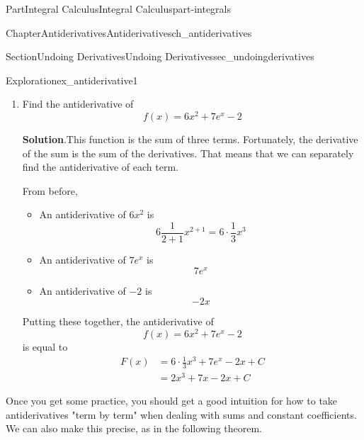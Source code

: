 \documentclass{tufte-book}
\newcommand{\blocktitlefont}{\relax}
\numberwithin{equation}{chapter}
\newcommand{\amp}{&}
\begin{document}
\begin{partptx}{Part}{Integral Calculus}{}{Integral Calculus}{}{}{part-integrals}
\begin{chapterptx}{Chapter}{Antiderivatives}{}{Antiderivatives}{}{}{ch_antiderivatives}
\begin{sectionptx}{Section}{Undoing Derivatives}{}{Undoing Derivatives}{}{}{sec_undoingderivatives}
\begin{exploration}{Exploration}{}{ex_antiderivative1}
\begin{enumerate}[font=\bfseries,label=(\alph*),ref=\alph*]
\begin{enumerate}
\item{}Multiply the antiderivative of \(\frac{1}{x}\) by 7%
\item{}Add \(+C\) to get \emph{the} antiderivative.%
\end{enumerate}
%
\par
This means that if \(f(x) = 7\frac{1}{x} \), the antiderivative is%
\begin{equation*}
F(x) = 7\cdot \Big( \ln(|x|) \Big) + C
\end{equation*}
%
\item{}Find the antiderivative of%
\begin{equation*}
f(x) = 6x^2 + 7e^x - 2
\end{equation*}
%
\par\smallskip%
\noindent\textbf{\blocktitlefont Solution}.\hypertarget{ex_antiderivative1-3-2}{}\quad{}This function is the sum of three terms. Fortunately, the derivative of the sum is the sum of the derivatives. That means that we can separately find the antiderivative of each term.%
\par
From before,%
\begin{itemize}[label=\textbullet]
\item{}An antiderivative of \(6x^2\) is%
\begin{equation*}
6\frac{1}{2+1}x^{2+1} = 6\cdot \frac{1}{3} x^3
\end{equation*}
%
\item{}An antiderivative of \(7e^x\) is%
\begin{equation*}
7e^x
\end{equation*}
%
\item{}An antiderivative of \(-2\) is%
\begin{equation*}
-2x
\end{equation*}
%
\end{itemize}
%
\par
Putting these together, the antiderivative of%
\begin{equation*}
f(x) = 6x^2 + 7e^x - 2 
\end{equation*}
is equal to%
\begin{align*}
F(x) \amp = 6\cdot\frac{1}{3} x^3 + 7 e^x -2x + C\\
\amp = 2x^3 + 7x -2x + C
\end{align*}
%
\end{enumerate}%
\end{exploration}%
Once you get some practice, you should get a good intuition for how to take antiderivatives "term by term" when dealing with sums and constant coefficients. We can also make this precise, as in the following theorem.%

\end{sectionptx}
\end{chapterptx}
\end{partptx}
\end{document}
